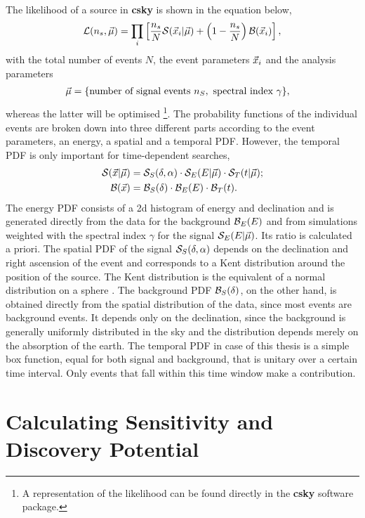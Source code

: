 The likelihood of a source in \textbf{csky} is shown in the equation below,
\begin{equation}
  \mathcal{L}(n_s,\vec{\mu})
  = \prod_i \left[ 
    \frac{n_s}{N} \mathcal{S}(\vec{x}_i|\vec{\mu})
    + \left( 1 - \frac{n_s}{N} \right) \mathcal{B}(\vec{x}_i)
   \right],
  \label{eq:lh}
\end{equation}
with the total number of events $N$, the event parameters $\vec{x}_i$ and the analysis parameters
\begin{align}
  \vec{\mu} &= \{\text{number of signal events }n_S, \text{ spectral index }\gamma\},
\end{align}
whereas the latter will be optimised \footnote{A representation of the likelihood can be found directly in the \textbf{csky} software package.}.
The probability functions of the individual events are broken down into three different parts according to the event parameters, an energy, a spatial and a temporal PDF.
However, the temporal PDF is only important for time-dependent searches,
\begin{align}
  \mathcal{S}(\vec{x}|\vec{\mu})
  &= \mathcal{S}_S(\delta,\alpha)
  \cdot \mathcal{S}_E(E|\vec{\mu})
  \cdot \mathcal{S}_T(t|\vec{\mu});
  \\
  \mathcal{B}(\vec{x})
  &= \mathcal{B}_S(\delta)
  \cdot \mathcal{B}_E(E)
  \cdot \mathcal{B}_T(t).
  \label{eq:pdf}
\end{align}
The energy PDF consists of a 2d histogram of energy and declination and is generated directly from the data for the background $\mathcal{B}_E(E)$ and from simulations weighted with the spectral index $\gamma$ for the signal $\mathcal{S}_E(E|\vec{\mu})$.
Its ratio is calculated a priori.
The spatial PDF of the signal $\mathcal{S}_S(\delta,\alpha)$ depends on the declination and right ascension of the event and corresponds to a Kent distribution around the position of the source.
The Kent distribution is the equivalent of a normal distribution on a sphere \cite{kent}.
The background PDF $\mathcal{B}_S(\delta)$, on the other hand, is obtained directly from the spatial distribution of the data, since most events are background events.
It depends only on the declination, since the background is generally uniformly distributed in the sky and the distribution depends merely on the absorption of the earth.
The temporal PDF in case of this thesis is a simple box function, equal for both signal and background, that is unitary over a certain time interval.
Only events that fall within this time window make a contribution.

\section{Calculating Sensitivity and Discovery Potential}

